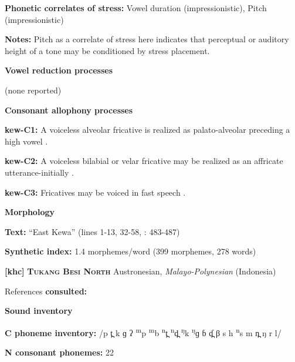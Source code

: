 \textbf{Phonetic correlates of stress:} Vowel duration (impressionistic), Pitch (impressionistic)



\textbf{Notes:} Pitch as a correlate of stress here indicates that perceptual or auditory height of a tone may be conditioned by stress placement.



\textbf{Vowel reduction processes}



(none reported)



\textbf{Consonant allophony processes}



\textbf{kew-C1:} A voiceless alveolar fricative is realized as palato-alveolar preceding a high vowel \citep[24]{Franklin1971}.



\textbf{kew-C2:} A voiceless bilabial or velar fricative may be realized as an affricate utterance-initially \citep[24]{Franklin1971}.



\textbf{kew-C3:} Fricatives may be voiced in fast speech \citep[24]{Franklin1971}.



\textbf{Morphology}



\textbf{Text:} “East Kewa” (lines 1-13, 32-58, \citealt{FranklinFranklin1978}: 483-487)



\textbf{Synthetic index:} 1.4 morphemes/word (399 morphemes, 278 words)



\textbf{[khc]}   \textbf{\textsc{Tukang Besi North}}  Austronesian, \textit{Malayo-Polynesian} (Indonesia)



References \textbf{consulted:} \citet{Donohue1999}



\textbf{Sound inventory}



\textbf{C phoneme inventory:} /p t̪ k ɡ ʔ \textsuperscript{m}p \textsuperscript{m}b \textsuperscript{n}t̪ \textsuperscript{n}d̪ \textsuperscript{ŋ}k \textsuperscript{ŋ}ɡ ɓ ɗ̪ β s h \textsuperscript{n}s m n̪ ŋ r l/



\textbf{N consonant phonemes:} 22



